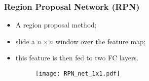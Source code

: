 \documentclass{beamer}
\begin{document}
			\begin{frame}\frametitle{Region Proposal Network (RPN)}
				\begin{itemize}
				\item A region proposal method;
				\item slide a $n \times n$ window over the feature map;
				\item this feature is then fed to two FC layers.

				\begin{figure}
			\texttt{[image: RPN\_net\_1x1.pdf]}
			\end{figure}


					\end{itemize}
			\end{frame}


\end{document}
